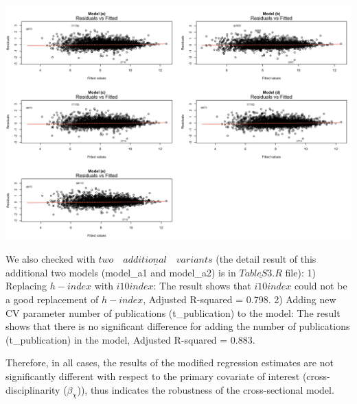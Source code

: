 \documentclass{article}\usepackage[]{graphicx}\usepackage[]{color}
\begin{document}
\begin{description}
    \begin{center}
    \includegraphics[scale=0.33]{ResidualPlots_TableS3.png}
    \end{center}
  \item[$\bullet$] We also checked with $\underline{two \quad additional \quad variants}$ (the detail result of this additional two models (model\_a1 and model\_a2) is in $\underline{TableS3.R}$ file): 1) Replacing $h-index$ with $i10index$: The result shows that $i10index$ could not be a good replacement of $h-index$, Adjusted R-squared = 0.798. 2) Adding new CV parameter number of publications (t\_publication) to the model: The result shows that there is no significant difference for adding the number of publications (t\_publication) in the model, Adjusted R-squared = 0.883.
  \item Therefore, in all cases, the results of the modified regression estimates are not significantly different with respect to the primary covariate of interest (cross-disciplinarity ($\beta_{\chi}$)), thus indicates the robustness of the cross-sectional model.
\end{description}

\newpage
\end{document}
